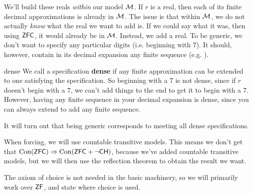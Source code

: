 \documentclass{article}
\begin{document}
We'll build these reals \textit{within} our model $\mathcal{M}$. If $r$ is a real, then each of its finite decimal approximations is already in $\mathcal{M}$. The issue is that within $\mathcal{M}$, we do not actually \textit{know} what the real we want to add is. If we could say what it was, then using $\mathsf{ZFC}$, it would already be in $\mathcal{M}$. Instead, we add a  real. \gap
To be generic, we don't want to specify any particular digits (i.e. beginning with $7$). It should, however, contain in its decimal expansion any finite sequence (e.g. ). \begin{fancydefine}{dense}
    We call a specification \textbf{dense} if any finite approximation can be extended to one satisfying the specification. \gap
    So beginning with a $7$ is not dense, since if $r$ doesn't begin with a $7$, we can't add things to the end to get it to begin with a $7$. However, having any finite sequence in your decimal expansion is dense, since you can always extend to add any finite sequence.
\end{fancydefine}
It will turn out that being generic corresponds to meeting all dense specifications.
\begin{remark*}
    When forcing, we will use countable transitive models. This means we don't get that $\operatorname{Con}(\mathsf{ZFC}) \Rightarrow \operatorname{Con}(\mathsf{ZFC} + \neg \mathsf{CH})$, because we've added countable transitive models, but we will then use the reflection theorem to obtain the result we want.
\end{remark*}
\begin{remark*}
    The axiom of choice is not needed in the basic machinery, so we will primarily work over $\mathsf{ZF}$, and state where choice is used.
\end{remark*}
\end{document}
